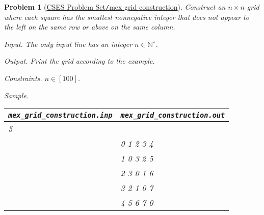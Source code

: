 \documentclass{article}
\newtheorem{problem}{Problem}
\begin{document}
\begin{problem}[\href{https://cses.fi/problemset/task/3419}{CSES Problem Set{\tt/}mex grid construction}]
    Construct an $n\times n$ grid where each square has the smallest nonnegative integer that does not appear to the left on the same row or above on the same column.
    \item {\sf Input.} The only input line has an integer $n\in\mathbb{N}^\star$.
    \item {\sf Output.} Print the grid according to the example.
    \item {\sf Constraints.} $n\in[100]$.
    \item {\sf Sample.}
    \begin{table}[H]
        \centering
        \begin{tabular}{|l|l|}
            \hline
            \verb|mex_grid_construction.inp| & \verb|mex_grid_construction.out| \\
            \hline
            5 & \\
            & 0 1 2 3 4 \\
            & 1 0 3 2 5 \\
            & 2 3 0 1 6 \\
            & 3 2 1 0 7 \\
            & 4 5 6 7 0 \\            
            \hline
        \end{tabular}
    \end{table}
\end{problem}
\end{document}
